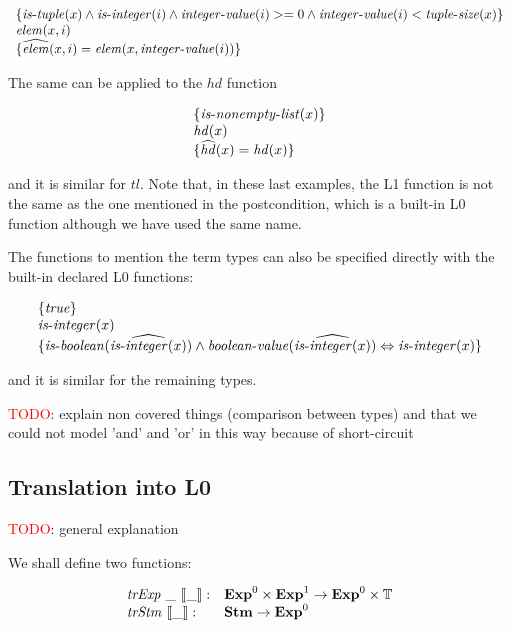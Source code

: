 \[
\begin{array}{l}
\{ \mathit{is\mbox{-}tuple}(x) \wedge \mathit{is\mbox{-}integer}(i) \wedge \mathit{integer\mbox{-}value}(i) >= 0 \wedge \mathit{integer\mbox{-}value}(i) < \mathit{tuple\mbox{-}size}(x) \}\\
\mathit{elem}(x, i)\\
\{ \widehat{\mathit{elem}}(x, i) = \mathit{elem}(x, \mathit{integer\mbox{-}value}(i)) \}
\end{array}
\]

The same can be applied to the $\mathit{hd}$ function

\[
\begin{array}{l}
\{ \mathit{is\mbox{-}nonempty\mbox{-}list}(x) \}\\
\mathit{hd}(x)\\
\{ \widehat{\mathit{hd}}(x) = \mathit{hd}(x) \}
\end{array}
\]

and it is similar for $\mathit{tl}$. Note that, in these last examples, 
the L1 function is not the same as the one mentioned in the postcondition,
which is a built-in L0 function although we have used the same name.

The functions to mention the term types can also be specified 
directly with the built-in declared L0 functions:

\[
\begin{array}{l}
\{ \mathit{true} \}\\
\mathit{is\mbox{-}integer}(x)\\
\{ \mathit{is\mbox{-}boolean}(\widehat{\mathit{is\mbox{-}integer}(x)}) \wedge 
  \mathit{boolean\mbox{-}value}(\widehat{\mathit{is\mbox{-}integer}(x)}) \Leftrightarrow \mathit{is\mbox{-}integer}(x) \}
\end{array}
\]

and it is similar for the remaining types.

\textcolor{red}{TODO}: explain non covered things (comparison between types)
and that we could not model 'and' and 'or' in this way because of short-circuit

\subsection{Translation into L0}

\textcolor{red}{TODO}: general explanation

We shall define two functions:

\[
\begin{array}{ll}
\mathit{trExp}~\_~\llbracket\_\rrbracket : & \mathbf{Exp}^{0} \times \mathbf{Exp}^{1} \rightarrow \mathbf{Exp}^{0} \times \mathbb{T}\\
\mathit{trStm}~\llbracket\_\rrbracket : & \mathbf{Stm} \rightarrow \mathbf{Exp}^{0}
\end{array}
\]

